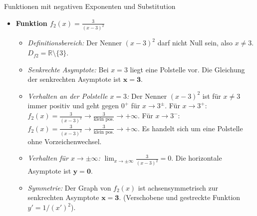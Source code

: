 \begin{loesungsumgebung}{Funktionen mit negativen Exponenten und Substitution}
\begin{enumerate}[label=(\alph*)]
\begin{itemize}
        \item \textbf{Funktion $f_2(x) = \frac{3}{(x-3)^2}$}
        \begin{itemize}
            \item \textit{Definitionsbereich:} Der Nenner $(x-3)^2$ darf nicht Null sein, also $x \neq 3$. $D_{f2} = \mathbb{R} \setminus \{3\}$.
            \item \textit{Senkrechte Asymptote:} Bei $x=3$ liegt eine Polstelle vor. Die Gleichung der senkrechten Asymptote ist $\mathbf{x=3}$.
            \item \textit{Verhalten an der Polstelle $x=3$:}
            Der Nenner $(x-3)^2$ ist für $x \neq 3$ immer positiv und geht gegen $0^+$ für $x \to 3^\pm$.
            Für $x \to 3^+$: $f_2(x) = \frac{3}{(x-3)^2} \to \frac{3}{\text{klein pos.}} \to +\infty$.
            Für $x \to 3^-$: $f_2(x) = \frac{3}{(x-3)^2} \to \frac{3}{\text{klein pos.}} \to +\infty$.
            Es handelt sich um eine Polstelle ohne Vorzeichenwechsel.
            \item \textit{Verhalten für $x \to \pm\infty$:}
            $\lim_{x \to \pm\infty} \frac{3}{(x-3)^2} = 0$.
            Die horizontale Asymptote ist $\mathbf{y=0}$.
            \item \textit{Symmetrie:} Der Graph von $f_2(x)$ ist achsensymmetrisch zur senkrechten Asymptote $\mathbf{x=3}$. (Verschobene und gestreckte Funktion $y' = 1/(x')^2$).
        \end{itemize}


\end{itemize}
\end{enumerate}
\end{loesungsumgebung}
